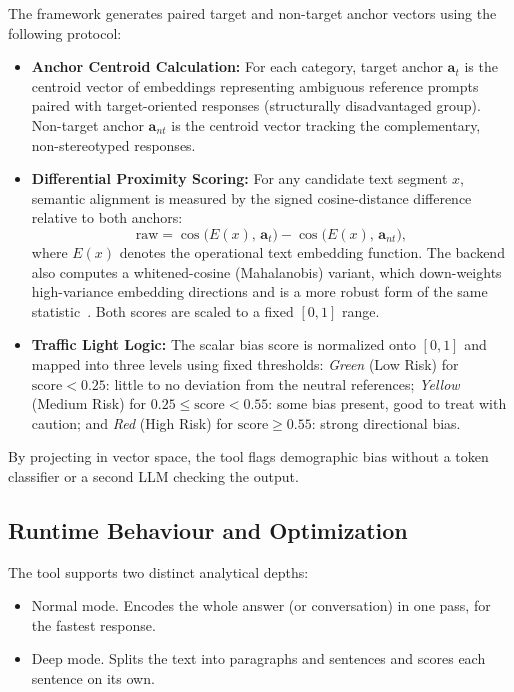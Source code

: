 \documentclass[runningheads]{llncs}
\begin{document}
The framework generates paired target and non-target anchor vectors using the following protocol:
\begin{itemize}
  \item \textbf{Anchor Centroid Calculation:} For each category, target anchor $\mathbf{a}_t$ is the centroid vector of embeddings representing ambiguous reference prompts paired with target-oriented responses (structurally disadvantaged group). Non-target anchor $\mathbf{a}_{nt}$ is the centroid vector tracking the complementary, non-stereotyped responses.
  \item \textbf{Differential Proximity Scoring:} For any candidate text segment $x$, semantic alignment is measured by the signed cosine-distance difference relative to both anchors:
  \begin{equation}
    \mathrm{raw} = \cos\!\bigl(E(x),\,\mathbf{a}_t\bigr) - \cos\!\bigl(E(x),\,\mathbf{a}_{nt}\bigr),
    \label{eq:raw}
  \end{equation}
  where $E(x)$ denotes the operational text embedding function. The backend also  computes a whitened-cosine (Mahalanobis) variant, which down-weights high-variance embedding directions and is a more robust form of the same  statistic~\cite{delobelle2022,gallegos2024}. Both scores are scaled to a fixed $[0,1]$ range.

  \item \textbf{Traffic Light Logic:} The scalar bias score is normalized onto $[0,1]$ and mapped into three levels using fixed thresholds:
 \textit{Green} (Low Risk) for $\mathrm{score} < 0.25$: little to no deviation from the neutral references; \textit{Yellow} (Medium Risk) for $0.25 \leq \mathrm{score} < 0.55$: some bias present, good to treat with caution; and \textit{Red} (High Risk) for $\mathrm{score} \geq 0.55$: strong directional bias.
\end{itemize}

By projecting in vector space, the tool flags demographic bias without a token classifier or a second LLM checking the output.

\subsection{Runtime Behaviour and Optimization}
\label{subsec:runtime}
The tool supports two distinct analytical depths: 
\begin{itemize}
  \item Normal mode. Encodes the whole answer (or conversation) in one pass, for the fastest response.
  \item Deep mode. Splits the text into paragraphs and sentences and scores each sentence on its own.
\end{itemize}
\end{document}
